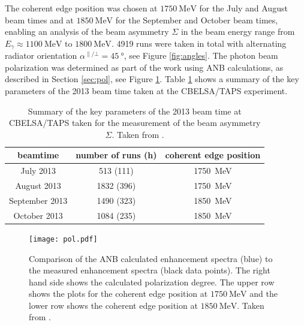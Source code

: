 The coherent edge position was chosen at $\SI{1750}{\mega\eV}$ for the July and August beam times and at $\SI{1850}{\mega\eV}$ for the September and October beam times, enabling an analysis of the beam asymmetry $\Sigma$ in the beam energy range from $E_\gamma\approx\SI{1100}{\mega\eV}$ to $\SI{1800}{\mega\eV}$.  4919 runs were taken in total  with alternating radiator orientation $\alpha^{\parallel/\bot}=\SI{45}{\degree}$, see Figure \ref{fig:angles}. The photon beam polarization was determined as part of the work \cite{farahphd} using ANB calculations, as described in Section \ref{sec:pol}, see Figure \ref{fig:pol1}. Table \ref{tab:sumbeam} shows a summary of the key parameters of the 2013 beam time taken at the CBELSA/TAPS experiment. 
\begin{table}[htbp]
	\centering
	\begin{tabular}{ccc}
		\toprule
		\textbf{beamtime} & \textbf{number of runs (h)} & \textbf{coherent edge position}\\
		\hline
		July 2013 & 513 (111) & \SI{1750}{\mega\eV}\\	
		August 2013 & 1832 (396) & \SI{1750}{\mega\eV}\\		
		September 2013 & 1490 (323) & \SI{1850}{\mega\eV}\\		
		October 2013 & 1084 (235) & \SI{1850}{\mega\eV}\\			
		\bottomrule
	\end{tabular}
	\caption{Summary of the key parameters of the 2013 beam time at CBELSA/TAPS taken for the measurement of the beam asymmetry $\Sigma$. Taken from \cite{farahphd}.}
	\label{tab:sumbeam}
\end{table}
\begin{figure}[t]
	\centering
	\texttt{[image: pol.pdf]}
	\caption{Comparison of the ANB calculated enhancement spectra (blue) to the measured enhancement spectra (black data points). The right hand side shows the calculated polarization degree. The upper row shows the plots for the coherent edge position at $\SI{1750}{\mega\eV}$ and the lower row shows the coherent edge position at $\SI{1850}{\mega\eV}$. Taken from \cite{farahphd}.}
	\label{fig:pol1}
\end{figure}




